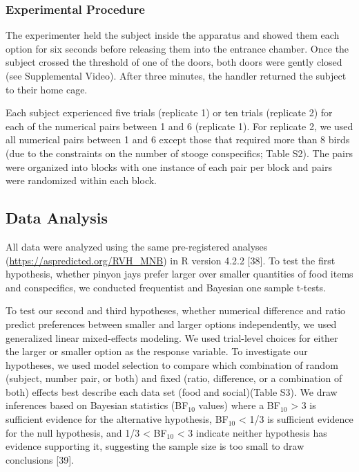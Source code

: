 \documentclass[
  ,doc,floatsintext]{apa6}
\begin{document}
\hypertarget{experimental-procedure-1}{%
\subsubsection{Experimental Procedure}\label{experimental-procedure-1}}

The experimenter held the subject inside the apparatus and showed them each option for six seconds before releasing them into the entrance chamber. Once the subject crossed the threshold of one of the doors, both doors were gently closed (see Supplemental Video). After three minutes, the handler returned the subject to their home cage.

Each subject experienced five trials (replicate 1) or ten trials (replicate 2) for each of the numerical pairs between 1 and 6 (replicate 1). For replicate 2, we used all numerical pairs between 1 and 6 except those that required more than 8 birds (due to the constraints on the number of stooge conspecifics; Table S2). The pairs were organized into blocks with one instance of each pair per block and pairs were randomized within each block.

\hypertarget{data-analysis}{%
\subsection{Data Analysis}\label{data-analysis}}

All data were analyzed using the same pre-registered analyses (\url{https://aspredicted.org/RVH_MNB}) in R version 4.2.2 {[}38{]}. To test the first hypothesis, whether pinyon jays prefer larger over smaller quantities of food items and conspecifics, we conducted frequentist and Bayesian one sample t-tests.

To test our second and third hypotheses, whether numerical difference and ratio predict preferences between smaller and larger options independently, we used generalized linear mixed-effects modeling. We used trial-level choices for either the larger or smaller option as the response variable. To investigate our hypotheses, we used model selection to compare which combination of random (subject, number pair, or both) and fixed (ratio, difference, or a combination of both) effects best describe each data set (food and social)(Table S3). We draw inferences based on Bayesian statistics (BF\(_{10}\) values) where a BF\(_{10}\) \textgreater{} 3 is sufficient evidence for the alternative hypothesis, BF\(_{10}\) \textless{} 1/3 is sufficient evidence for the null hypothesis, and 1/3 \textless{} BF\(_{10}\) \textless{} 3 indicate neither hypothesis has evidence supporting it, suggesting the sample size is too small to draw conclusions {[}39{]}.
\end{document}
